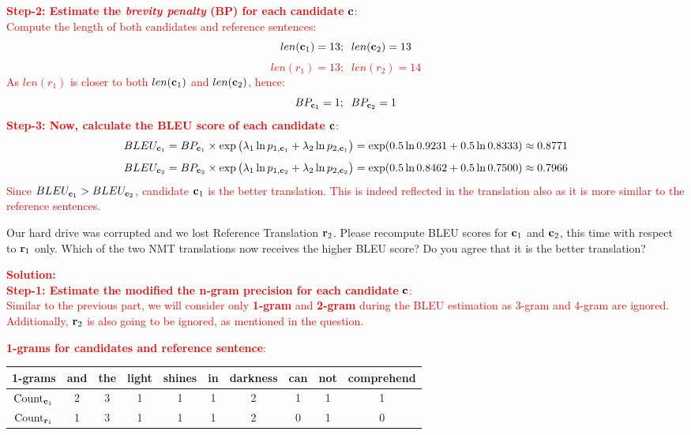 \begin{parts}
\begin{subparts}
\textcolor{red}{\textbf{Step-2: Estimate the \textit{brevity penalty} (BP) for each candidate} $\mathbf{c}$:\\
Compute the length of both candidates and reference sentences:
\[len(\mathbf{c}_1) = 13; \;\; len(\mathbf{c}_2) = 13\]
\[len(r_1) = 13; \;\; len(r_2) = 14\]
As $len(r_1)$ is closer to both $len(\mathbf{c}_1)$ and $len(\mathbf{c}_2)$, hence:
\[BP_{\mathbf{c}_1}=1; \;\; BP_{\mathbf{c}_2}=1\]}
\textcolor{red}{\textbf{Step-3: Now, calculate the BLEU score of each candidate} $\mathbf{c}$:\\
\[ BLEU_{\mathbf{c}_1} = BP_{\mathbf{c}_1} \times \exp \big( \lambda_1 \ln p_{1,\mathbf{c}_1} + \lambda_2 \ln p_{2,\mathbf{c}_1} \big) = \exp (0.5 \ln 0.9231 + 0.5 \ln 0.8333) \approx 0.8771 \]
\[ BLEU_{\mathbf{c}_2} = BP_{\mathbf{c}_2} \times \exp \big( \lambda_1 \ln p_{1,\mathbf{c}_2} + \lambda_2 \ln p_{2,\mathbf{c}_2} \big)  = \exp (0.5 \ln 0.8462 + 0.5 \ln 0.7500) \approx 0.7966 \]
Since $BLEU_{\mathbf{c}_1} > BLEU_{\mathbf{c}_2}$, candidate $\mathbf{c}_1$ is the better translation. This is indeed reflected in the translation also as it is more similar to the reference sentences.
}


        \subpart[5] Our hard drive was corrupted and we lost Reference Translation $\mathbf{r}_2$. Please recompute BLEU scores for $\mathbf{c}_1$ and $\mathbf{c}_2$, this time with respect to $\mathbf{r}_1$ only. Which of the two NMT translations now receives the higher BLEU score? Do you agree that it is the better translation?

\textcolor{red}{\textbf{Solution: }\\
\textbf{Step-1: Estimate the modified the n-gram precision for each candidate} $\mathbf{c}$:\\
Similar to the previous part, we will consider only \textbf{1-gram} and \textbf{2-gram} during the BLEU estimation as 3-gram and 4-gram are ignored. Additionally, $\mathbf{r}_2$ is also going to be ignored, as mentioned in the question.}


\textcolor{red}{\textbf{1-grams for candidates and reference sentence}:}

\begin{table}[h!]
\centering
{\color{red}\begin{tabular}{|c|c|c|c|c|c|c|c|c|c|} 
 \hline
 \textbf{1-grams} & and & the & light & shines & in & darkness & can & not & comprehend \\ [0.5ex] 
 \hline
 $\text{Count}_{\mathbf{c}_1}$ & 2 & 3 & 1 & 1 & 1 & 2 & 1 & 1 & 1\\  
 $\text{Count}_{\mathbf{r}_1}$ & 1 & 3 & 1 & 1 & 1 & 2 & 0 & 1 & 0\\ [1ex] 
 \hline
\end{tabular}}
\label{table:1}
\end{table}


\end{subparts}
\end{parts}
